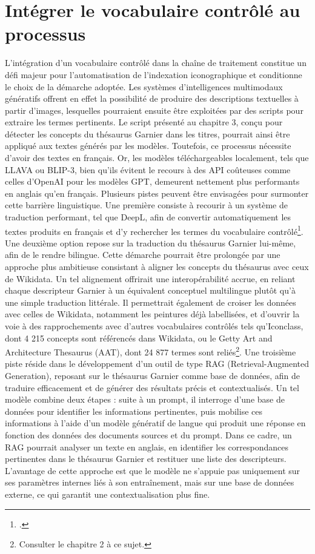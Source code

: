 \section[Le vocabulaire contrôlé]{Intégrer le vocabulaire contrôlé au processus}

L’intégration d’un vocabulaire contrôlé dans la chaîne de traitement constitue un défi majeur pour l’automatisation de l’indexation iconographique et conditionne le choix de la démarche adoptée. Les systèmes d’intelligences multimodaux génératifs offrent en effet la possibilité de produire des descriptions textuelles à partir d’images, lesquelles pourraient ensuite être exploitées par des scripts pour extraire les termes pertinents. Le script présenté au chapitre 3, conçu pour détecter les concepts du thésaurus Garnier dans les titres, pourrait ainsi être appliqué aux textes générés par les modèles. Toutefois, ce processus nécessite d’avoir des textes en français. Or, les modèles téléchargeables localement, tels que LLAVA ou BLIP-3, bien qu’ils évitent le recours à des API coûteuses comme celles d’OpenAI pour les modèles GPT, demeurent nettement plus performants en anglais qu’en français. 
Plusieurs pistes peuvent être envisagées pour surmonter cette barrière linguistique. Une première consiste à recourir à un système de traduction performant, tel que DeepL, afin de convertir automatiquement les textes produits en français et d’y rechercher les termes du vocabulaire contrôlé\footcite{deeplTranslateText}. Une deuxième option repose sur la traduction du thésaurus Garnier lui-même, afin de le rendre bilingue. Cette démarche pourrait être prolongée par une approche plus ambitieuse consistant à aligner les concepts du thésaurus avec ceux de Wikidata. Un tel alignement offrirait une interopérabilité accrue, en reliant chaque descripteur Garnier à un équivalent conceptuel multilingue plutôt qu’à une simple traduction littérale. Il permettrait également de croiser les données avec celles de Wikidata, notamment les peintures déjà labellisées, et d’ouvrir la voie à des rapprochements avec d’autres vocabulaires contrôlés tels qu’Iconclass, dont 4 215 concepts sont référencés dans Wikidata, ou le Getty Art and Architecture Thesaurus (AAT), dont 24 877 termes sont reliés\footnote{Consulter le chapitre 2 à ce sujet.}.
Une troisième piste réside dans le développement d’un outil de type RAG (Retrieval-Augmented Generation), reposant sur le thésaurus Garnier comme base de données, afin de traduire efficacement et de générer des résultats précis et contextualisés. Un tel modèle combine deux étapes : suite à un prompt, il interroge d’une base de données pour identifier les informations pertinentes, puis mobilise ces informations à l’aide d’un modèle génératif de langue qui produit une réponse en fonction des données des documents sources et du prompt. Dans ce cadre, un RAG pourrait analyser un texte en anglais, en identifier les correspondances pertinentes dans le thésaurus Garnier et restituer une liste des descripteurs. L’avantage de cette approche est que le modèle ne s’appuie pas uniquement sur ses paramètres internes liés à son entraînement, mais sur une base de données externe, ce qui garantit une contextualisation plus fine.
